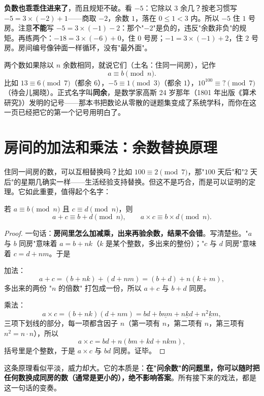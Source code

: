 \textbf{负数也乖乖住进来了}，而且规矩不破。看 $-5$：它除以 $3$ 余几？按老习惯写 $-5 = 3 \times (-2) + 1$——商取 $-2$，余数 $1$，落在 $0 \le 1 < 3$ 内。所以 $-5$ 住 $1$ 号房。注意\textbf{不能}写 $-5 = 3\times(-1) - 2$：那个"$-2$"是负的，违反"余数非负"的规矩。再练两个：$-18 = 3\times(-6) + 0$，住 $0$ 号房；$-1 = 3\times(-1) + 2$，住 $2$ 号房。房间编号像钟面一样循环，没有"最外面"。

\begin{faming}
两个数如果除以 $n$ 余数相同，就说它们（土名：住同一间房），记作
\[
a \equiv b \pmod{n}.
\]
比如 $13 \equiv 6 \pmod 7$（都余 $6$），$-5 \equiv 1 \pmod 3$（都余 $1$），$10^{100} \equiv ? \pmod 7$（待会儿揭晓）。正式名字叫\textbf{同余}，是数学家高斯 24 岁那年（1801 年出版《算术研究》）发明的记号——那本书把数论从零散的谜题集变成了系统学科，而你在这一页已经把它的第一个记号用明白了。
\end{faming}

\section{房间的加法和乘法：余数替换原理}

住同一间房的数，可以互相替换吗？比如 $100 \equiv 2 \pmod 7$，那"$100$ 天后"和"$2$ 天后"的星期几确实一样——生活经验支持替换。但这不是巧合，而是可以证明的定理。它如此重要，值得起个名字：

\begin{dingli}[余数替换原理]
若 $a \equiv b \pmod n$ 且 $c \equiv d \pmod n$，则
\[
a + c \equiv b + d \pmod n, \qquad a \times c \equiv b \times d \pmod n .
\]
\end{dingli}

\begin{proof}
一句话：\textbf{房间里怎么加减乘，出来再验余数，结果不会错}。写清楚些。"$a$ 与 $b$ 同房"意味着 $a = b + nk$（$k$ 是某个整数，多出来的整份）；"$c$ 与 $d$ 同房"意味着 $c = d + nm$。于是

加法：
\[
a + c = (b + nk) + (d + nm) = (b + d) + n(k + m),
\]
多出来的两份 "$n$ 的倍数" 打包成一份，所以 $a + c$ 与 $b+d$ 同房。

乘法：
\[
a \times c = (b + nk)(d + nm) = bd + \underline{bnm} + \underline{nkd} + \underline{n^2 km},
\]
三项下划线的部分，每一项都含因子 $n$（第一项有 $n$，第二项有 $n$，第三项有 $n^2 = n\cdot n$），所以
\[
a\times c = bd + n(bm + kd + nkm),
\]
括号里是个整数，于是 $a\times c$ 与 $bd$ 同房。证毕。
\end{proof}

这条原理看似平淡，威力却大。它的本质是：\textbf{在"问余数"的问题里，你可以随时把任何数换成同房的数（通常是更小的），绝不影响答案}。所有接下来的戏法，都是这一句话的变奏。

